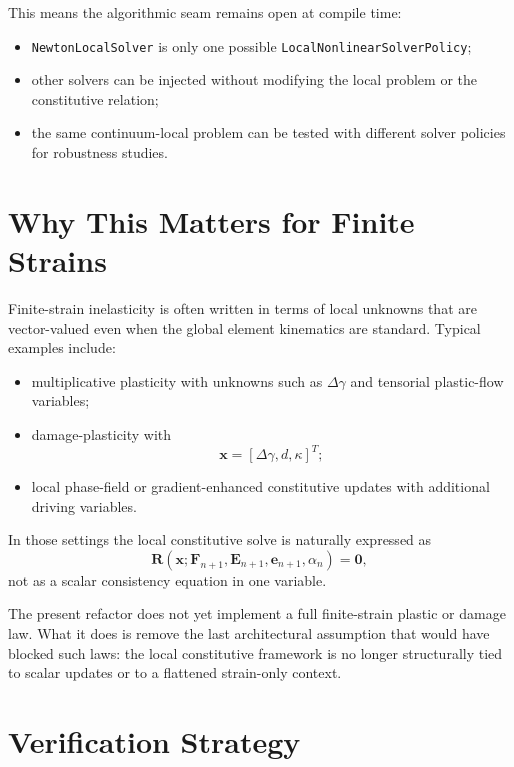 This means the algorithmic seam remains open at compile time:
\begin{itemize}
  \item \texttt{NewtonLocalSolver} is only one possible
        \texttt{LocalNonlinearSolverPolicy};
  \item other solvers can be injected without modifying the local problem or
        the constitutive relation;
  \item the same continuum-local problem can be tested with different solver
        policies for robustness studies.
\end{itemize}

\section{Why This Matters for Finite Strains}

Finite-strain inelasticity is often written in terms of local unknowns that are
vector-valued even when the global element kinematics are standard.  Typical
examples include:
\begin{itemize}
  \item multiplicative plasticity with unknowns such as
        $\Delta\gamma$ and tensorial plastic-flow variables;
  \item damage-plasticity with
        \[
          \mathbf{x} = [\Delta\gamma, d, \kappa]^T;
        \]
  \item local phase-field or gradient-enhanced constitutive updates with
        additional driving variables.
\end{itemize}

In those settings the local constitutive solve is naturally expressed as
\[
  \mathbf{R}\!\left(
    \mathbf{x};
    \mathbf{F}_{n+1},
    \mathbf{E}_{n+1},
    \mathbf{e}_{n+1},
    \alpha_n
  \right)
  = \mathbf{0},
\]
not as a scalar consistency equation in one variable.

The present refactor does not yet implement a full finite-strain plastic or
damage law.  What it does is remove the last architectural assumption that
would have blocked such laws: the local constitutive framework is no longer
structurally tied to scalar updates or to a flattened strain-only context.

\section{Verification Strategy}

